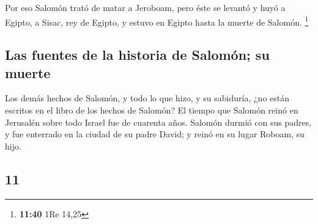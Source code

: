 \begin{paracol}{2}
 Por eso Salomón trató de matar a Jeroboam, pero éste se
levantó y huyó a Egipto, a Sisac, rey de Egipto, y estuvo en Egipto
hasta la muerte de Salomón. \footnote{\textbf{11:40} 1Re 14,25}

\hypertarget{las-fuentes-de-la-historia-de-salomuxf3n-su-muerte}{%
\subsection{Las fuentes de la historia de Salomón; su
muerte}\label{las-fuentes-de-la-historia-de-salomuxf3n-su-muerte}}

 Los demás hechos de Salomón, y todo lo que hizo, y su
sabiduría, ¿no están escritos en el libro de los hechos de Salomón?
 El tiempo que Salomón reinó en Jerusalén sobre todo
Israel fue de cuarenta años.  Salomón durmió con sus
padres, y fue enterrado en la ciudad de su padre David; y reinó en su
lugar Roboam, su hijo.

\switchcolumn
\begin{otherlanguage}{english}

\hypertarget{section-21}{%
\section{11}\label{section-21}}


\end{otherlanguage}
\end{paracol}
